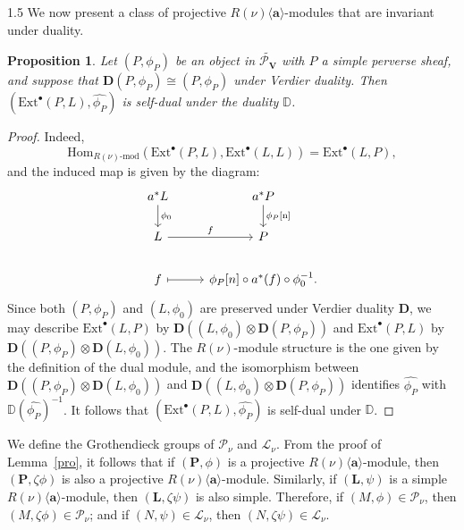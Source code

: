 \documentclass[10pt]{amsart}
\newtheorem{proposition}[theorem]{Proposition}
\begin{document}
\begin{spacing}{1.5}
We now present a class of projective $R(\nu)\langle\mathbf{a}\rangle$-modules that are invariant under duality.

\begin{proposition}\label{dual}
Let $(P, \phi_P)$ be an object in $\widetilde{\mathcal{P}_{\mathbf{V}}}$ with $P$ a simple perverse sheaf, and suppose that $\mathbf{D}(P, \phi_P) \cong (P, \phi_P)$ under Verdier duality. Then $(\mathrm{Ext}^{\bullet}(P, L), \hat{\phi_P})$ is self-dual under the duality $\mathbb{D}$.
\end{proposition}

\begin{proof}
Indeed,
\[
\mathrm{Hom}_{R(\nu)\text{-}\mathrm{mod}}(\mathrm{Ext}^{\bullet}(P, L), \mathrm{Ext}^{\bullet}(L, L)) = \mathrm{Ext}^{\bullet}(L, P),
\]
and the induced map is given by the diagram:
\[
\begin{tikzcd}
a^* L \arrow[d, "\phi_0"] & a^* P \arrow[d, "\phi_P\text{[n]}"] \\
L \arrow[r, "f"] & P \\
f \arrow[r, maps to] & \phi_P[n] \circ a^*(f) \circ \phi_0^{-1}.
\end{tikzcd}
\]
Since both $(P, \phi_P)$ and $(L, \phi_0)$ are preserved under Verdier duality $\mathbf{D}$, we may describe $\mathrm{Ext}^{\bullet}(L, P)$ by $\mathbf{D}((L, \phi_0) \otimes \mathbf{D}(P, \phi_P))$ and $\mathrm{Ext}^{\bullet}(P, L)$ by $\mathbf{D}((P, \phi_P) \otimes \mathbf{D}(L, \phi_0))$. The $R(\nu)$-module structure is the one given by the definition of the dual module, and the isomorphism between $\mathbf{D}((P, \phi_P) \otimes \mathbf{D}(L, \phi_0))$ and $\mathbf{D}((L, \phi_0) \otimes \mathbf{D}(P, \phi_P))$ identifies $\hat{\phi_P}$ with $\mathbb{D}(\hat{\phi_P})^{-1}$. It follows that $(\mathrm{Ext}^{\bullet}(P, L), \hat{\phi_P})$ is self-dual under $\mathbb{D}$.
\end{proof}
We define the Grothendieck groups of $\mathcal{P}_{\nu}$ and $\mathcal{L}_{\nu}$. From the proof of Lemma~\ref{pro}, it follows that if $(\mathbf{P}, \phi)$ is a projective $R(\nu)\langle\mathbf{a}\rangle$-module, then $(\mathbf{P}, \zeta \phi)$ is also a projective $R(\nu)\langle\mathbf{a}\rangle$-module. Similarly, if $(\mathbf{L}, \psi)$ is a simple $R(\nu)\langle\mathbf{a}\rangle$-module, then $(\mathbf{L}, \zeta \psi)$ is also simple. Therefore, if $(M, \phi) \in \mathcal{P}_{\nu}$, then $(M, \zeta \phi) \in \mathcal{P}_{\nu}$; and if $(N, \psi) \in \mathcal{L}_{\nu}$, then $(N, \zeta \psi) \in \mathcal{L}_{\nu}$.


\end{spacing}
\end{document}
